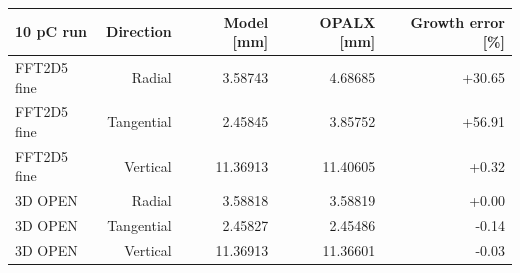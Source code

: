 \begin{tabular}{lrrrr}
\toprule
10 pC run & Direction & Model [mm] & OPALX [mm] & Growth error [\%] \\
\midrule
FFT2D5 fine & Radial & 3.58743 & 4.68685 & +30.65 \\
FFT2D5 fine & Tangential & 2.45845 & 3.85752 & +56.91 \\
FFT2D5 fine & Vertical & 11.36913 & 11.40605 & +0.32 \\
3D OPEN & Radial & 3.58818 & 3.58819 & +0.00 \\
3D OPEN & Tangential & 2.45827 & 2.45486 & -0.14 \\
3D OPEN & Vertical & 11.36913 & 11.36601 & -0.03 \\
\bottomrule
\end{tabular}
